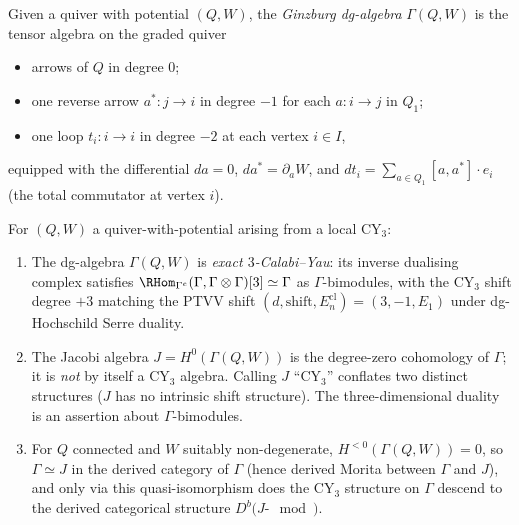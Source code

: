 \begin{definition}
\label{gl:def:ginzburg-dg}
Given a quiver with potential $(Q, W)$, the
\emph{Ginzburg dg-algebra} $\Gamma(Q, W)$ is the tensor algebra on the graded
quiver
\begin{itemize}
\item arrows of $Q$ in degree $0$;
\item one reverse arrow $a^{*} \colon j \to i$ in degree $-1$ for each
$a \colon i \to j$ in $Q_1$;
\item one loop $t_i \colon i \to i$ in degree $-2$ at each vertex $i \in I$,
\end{itemize}
equipped with the differential
$d a = 0$, $d a^{*} = \partial_a W$, and $d t_i = \sum_{a \in Q_1}
[a, a^{*}] \cdot e_i$ (the total commutator at vertex $i$).
\end{definition}

\begin{proposition}
\label{prop:cy3-on-gamma-not-j}
For $(Q, W)$ a quiver-with-potential arising from a
local CY$_3$:
\begin{enumerate}
\item[(a)] The dg-algebra $\Gamma(Q, W)$ is \emph{exact $3$-Calabi--Yau}: its
inverse dualising complex satisfies
$\RHom_{\Gamma^e}(\Gamma, \Gamma \otimes \Gamma)[3] \simeq \Gamma$ as
$\Gamma$-bimodules, with the CY$_3$ shift degree $+3$ matching the PTVV shift
$(d, \mathrm{shift}, E_n^{\mathrm{cl}}) = (3, -1, E_1)$ under dg-Hochschild
Serre duality.
\item[(b)] The Jacobi algebra $J = H^0(\Gamma(Q, W))$ is the degree-zero
cohomology of $\Gamma$; it is \emph{not} by itself a CY$_3$ algebra. Calling
$J$ ``CY$_3$'' conflates two distinct structures ($J$ has no intrinsic shift structure). The
three-dimensional duality is an assertion about $\Gamma$-bimodules.
\item[(c)] For $Q$ connected and $W$ suitably non-degenerate,
$H^{<0}(\Gamma(Q, W)) = 0$, so $\Gamma \simeq J$ in the derived category of
$\Gamma$ (hence derived Morita between $\Gamma$ and $J$), and only via this
quasi-isomorphism does the CY$_3$ structure on $\Gamma$ descend to the
derived categorical structure $D^b(J\text{-}\mod)$.
\end{enumerate}
\end{proposition}

